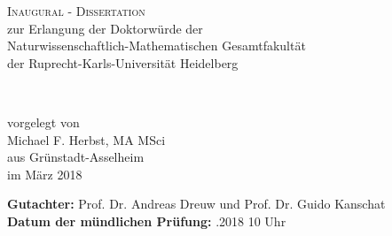 \begin{titlepage}
\begin{center}

	\Huge \textsc{Inaugural - Dissertation} \\[0.4cm]
	{\Large zur Erlangung der Doktorwürde der \\
	Naturwissenschaftlich-Mathematischen Gesamtfakultät \\
	der Ruprecht-Karls-Universität Heidelberg\\
	}

	\vfill

	{\Huge
	\textbf{\thesistitle}\\
	\vspace{0.5cm}
	\LARGE \thesissubtitle
	}

	\vfill

	\vfill

	{\large  vorgelegt von} \\
	\vspace{1.0cm}
	{\LARGE Michael F. Herbst, {\large \mbox{MA} \mbox{MSci}} }\\[-0.3em]
	{\large aus Grünstadt-Asselheim } \\
	\vspace{1.0cm}
	{\large im März 2018} \\

	\vspace{2cm}

	\begin{flushleft}
	\normalsize
		\textbf{Gutachter:} \qquad Prof. Dr. Andreas Dreuw \hfill und \hfill Prof. Dr. Guido Kanschat\\
		\textbf{Datum der mündlichen Prüfung:} .2018 10 Uhr
	\end{flushleft}
\end{center}
\end{titlepage}
